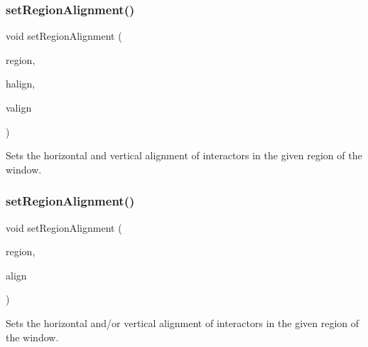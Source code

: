 \subsubsection{\texorpdfstring{set\+Region\+Alignment()}{setRegionAlignment()}\hspace{0.1cm}{\footnotesize\ttfamily [3/5]}}
{\footnotesize\ttfamily void set\+Region\+Alignment (\begin{DoxyParamCaption}\item[{\mbox{\hyperlink{classsgl_1_1GWindow_a81a01a86de31071a92e6cce0bab9bc4b}{Region}}}]{region,  }\item[{\mbox{\hyperlink{namespacesgl_aa00e70829e72ff16addc4d9f06fe3bc5}{Horizontal\+Alignment}}}]{halign,  }\item[{\mbox{\hyperlink{namespacesgl_a9c2ed22cfbd21f13df24ea193b310aee}{Vertical\+Alignment}}}]{valign }\end{DoxyParamCaption})\hspace{0.3cm}{\ttfamily [virtual]}}



Sets the horizontal and vertical alignment of interactors in the given region of the window. 

\mbox{\label{classsgl_1_1GWindow_ae4ff46516be9472498c0bf058b496e8b}} 
\subsubsection{\texorpdfstring{set\+Region\+Alignment()}{setRegionAlignment()}\hspace{0.1cm}{\footnotesize\ttfamily [4/5]}}
{\footnotesize\ttfamily void set\+Region\+Alignment (\begin{DoxyParamCaption}\item[{const std\+::string \&}]{region,  }\item[{const std\+::string \&}]{align }\end{DoxyParamCaption})\hspace{0.3cm}{\ttfamily [virtual]}}



Sets the horizontal and/or vertical alignment of interactors in the given region of the window. 

\mbox{\label{classsgl_1_1GWindow_ad1c76be81b3b865f78b0e91f0e1f07d4}} 
